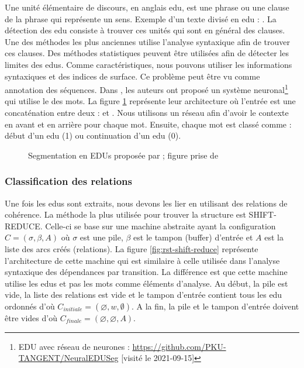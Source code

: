 \documentclass{KodeBook}
\begin{document}
Une unité élémentaire de discours, en anglais \ac{edu}, est une phrase ou une clause de la phrase qui représente un sens. 
Exemple d'un texte divisé en \ac{edu} : . 
La détection des \ac{edu} consiste à trouver ces unités qui sont en général des clauses. 
Une des méthodes les plus anciennes utilise l'analyse syntaxique afin de trouver ces clauses. 
Des méthodes statistiques peuvent être utilisées afin de détecter les limites des \ac{edu}s. 
Comme caractéristiques, nous pouvons utiliser les informations syntaxiques et des indices de surface. 
Ce problème peut être vu comme annotation des séquences. 
Dans \cite{2018-wang-al}, les auteurs ont proposé un système neuronal\footnote{EDU avec réseau de neurones : \url{https://github.com/PKU-TANGENT/NeuralEDUSeg} [visité le 2021-09-15]} qui utilise le  des mots. 
La figure \ref{fig:edu-embedding} représente leur architecture où l'entrée est une concaténation entre deux  :  et . 
Nous utilisons un réseau  afin d'avoir le contexte en avant et en arrière pour chaque mot. 
Ensuite, chaque mot est classé comme : début d'un \ac{edu} (1) ou continuation d'un \ac{edu} (0). 

\begin{figure}[!ht]
	\centering
	\caption[Segmentation en EDUs par embeddings]{Segmentation en EDUs proposée par \citet{2018-wang-al} ; figure prise de \cite{2019-jurafsky-martin}}
	\label{fig:edu-embedding}
\end{figure}

\subsubsection{Classification des relations}

Une fois les \acp{edu} sont extraits, nous devons les lier en utilisant des relations de cohérence. 
La méthode la plus utilisée pour trouver la structure  est SHIFT-REDUCE.  
Celle-ci se base sur une machine abstraite ayant la configuration $C = (\sigma, \beta, A)$ où $\sigma$ est une pile, $\beta$ est le tampon (buffer) d'entrée et $A$ est la liste des arcs créés (relations). 
La figure \ref{fig:rst-shift-reduce} représente l'architecture de cette machine qui est similaire à celle utilisée dans l'analyse syntaxique des dépendances par transition. 
La différence est que cette machine utilise les \acp{edu} et pas les mots comme éléments d'analyse.
Au début, la pile est vide, la liste des relations est vide et le tampon d'entrée contient tous les \ac{edu} ordonnés d'où  $C_{initiale} = (\varnothing, w, \emptyset)$. 
A la fin, la pile et le tampon d'entrée doivent être vides d'où $C_{finale} = (\varnothing, \varnothing, A)$.
\end{document}
